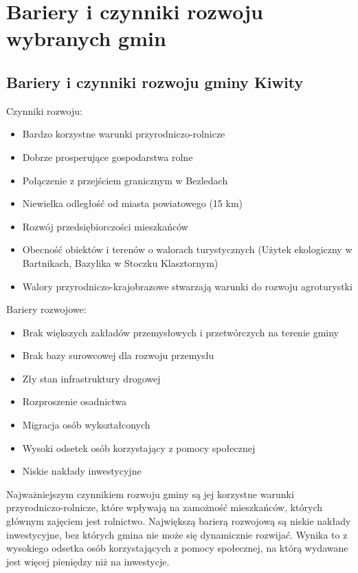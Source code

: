 \documentclass[a4paper,10pt]{article}
\begin{document}
\section{Bariery i czynniki rozwoju wybranych gmin}
  \subsection{Bariery i czynniki rozwoju gminy Kiwity}
    Czynniki rozwoju:
    
    \begin{itemize}
     \item Bardzo korzystne warunki przyrodniczo-rolnicze
     \item Dobrze prosperujące gospodarstwa rolne
     \item Połączenie z przejściem granicznym w Bezledach
     \item Niewielka odległość od miasta powiatowego (15 km)
     \item Rozwój przedsiębiorczości mieszkańców
     \item Obecność obiektów i terenów o walorach turystycznych (Użytek ekologiczny w Bartnikach, Bazylika w Stoczku Klasztornym)
     \item Walory przyrodniczo-krajobrazowe stwarzają warunki do rozwoju agroturystki
    \end{itemize}
    
    Bariery rozwojowe:
    \begin{itemize}
     \item Brak większych zakładów przemysłowych i przetwórczych na terenie gminy
     \item Brak bazy surowcowej dla rozwoju przemysłu
     \item Zły stan infrastruktury drogowej
     \item Rozproszenie osadnictwa
     \item Migracja osób wykształconych
     \item Wysoki odsetek osób korzystający z pomocy społecznej
     \item Niskie nakłady inwestycyjne
    \end{itemize}
    
    Najważniejszym czynnikiem rozwoju gminy są jej korzystne warunki przyrodniczo-rolnicze, które wpływają na zamożność mieszkańców, 
    których głównym zajęciem jest rolnictwo.
    Największą barierą rozwojową są niskie nakłady inwestycyjne, bez których gmina nie może się dynamicznie rozwijać. 
    Wynika to z wysokiego odsetka osób korzystających z pomocy społecznej, na którą wydawane jest więcej pieniędzy niż na inwestycje.
   
\end{document}
